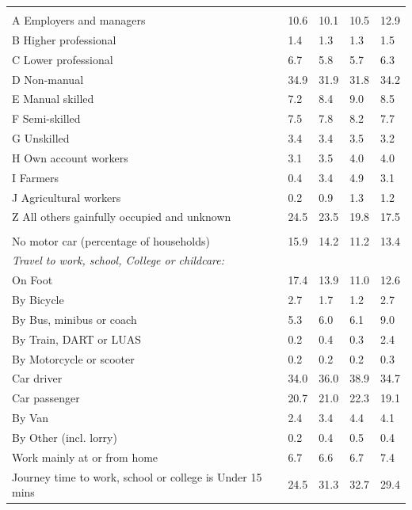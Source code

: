 \documentclass{article}
\begin{document}
\begin{table}[h]
\begin{tabular}{KTTTT}
\hline
    \\ 
    \hline
A Employers and managers & 10.6& 10.1& 10.5& 12.9\\
B Higher professional & 1.4& 1.3& 1.3& 1.5\\
C Lower professional & 6.7& 5.8& 5.7& 6.3\\
D Non-manual & 34.9& 31.9& 31.8& 34.2\\
E Manual skilled & 7.2& 8.4& 9.0& 8.5\\
F Semi-skilled & 7.5& 7.8& 8.2& 7.7\\
G Unskilled & 3.4& 3.4& 3.5& 3.2\\
H Own account workers & 3.1& 3.5& 4.0& 4.0\\
I Farmers & 0.4& 3.4& 4.9& 3.1\\
J Agricultural workers & 0.2& 0.9& 1.3& 1.2\\
Z All others gainfully occupied and unknown & 24.5& 23.5& 19.8& 17.5\\
\hline
{}\hline
    \\ 
    \hline
No motor car (percentage of households) & 15.9& 14.2& 11.2& 
13.4\\
    \hline 
\emph{Travel to work, school, College or childcare:} & & & \\
\quad On Foot & 17.4& 13.9& 11.0& 12.6\\ 
\quad By Bicycle & 2.7& 1.7& 1.2& 2.7\\ 
\quad By Bus, minibus or coach & 5.3& 6.0& 6.1& 9.0\\
\quad By Train, DART or LUAS & 0.2& 0.4& 0.3& 2.4\\
\quad By Motorcycle or scooter & 0.2& 0.2& 0.2& 0.3\\
\quad Car driver & 34.0 & 36.0& 38.9& 34.7\\
\quad Car passenger & 20.7& 21.0& 22.3& 19.1\\
\quad By Van & 2.4& 3.4& 4.4& 4.1\\
\quad By Other (incl. lorry) & 0.2& 0.4& 0.5& 0.4\\
    \hline
Work mainly at or from home & 6.7& 6.6& 6.7& 7.4\\
Journey time to work, school or college is Under 15 mins & 24.5& 31.3& 32.7& 29.4\\

\end{tabular}
\end{table}
\end{document}
